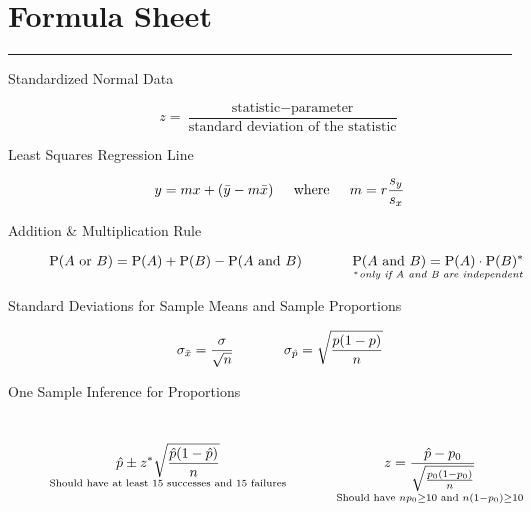 \documentclass[11pt]{article}
\begin{document}
\pagestyle{empty}
\section*{Formula Sheet} %
\hrule

\noindent

\begin{description}

\item[Standardized Normal Data]
$$z = \frac{\text{statistic} - \text{parameter}}{\text{standard deviation of the statistic}}$$

\item[Least Squares Regression Line] 
$$y = m x + (\bar{y}-m\bar{x})  \hspace*{0.2in} \text{where} \hspace*{0.2in}  m = r \frac{s_y}{s_x}   $$  


\item[Addition \& Multiplication Rule] 
$$\operatorname{P} (A \text{ or } B) = \operatorname{P} (A)+ \operatorname{P} (B) - \operatorname{P} (A \text{ and } B) \hspace*{0.5in} \underset{^*\textit{only if A and B are independent}}{\operatorname{P} (A \text{ and } B) = \operatorname{P} (A) \cdot \operatorname{P} (B)^*}$$


\item[Standard Deviations for Sample Means and Sample Proportions] 
$$\sigma_{\bar{x}} = \frac{\sigma}{\sqrt{n}} \hspace*{0.5in} \sigma_{\hat{p}} = \sqrt{\frac{p(1-p)}{n} }$$


\item[One Sample Inference for Proportions] ~ %
$$\underset{\text{Should have at least 15 successes and 15 failures}}{\displaystyle \hat{p} \pm z^* \sqrt{\frac{\hat{p}(1-\hat{p})}{n}}}  \hspace*{0.5in} \underset{\text{Should have } np_0 \ge 10 \text{ and } n(1-p_0) \ge 10}{z = \frac{\hat{p}-p_0}{\sqrt{\frac{p_0(1-p_0)}{n}}}}$$



\end{description}
\end{document}

